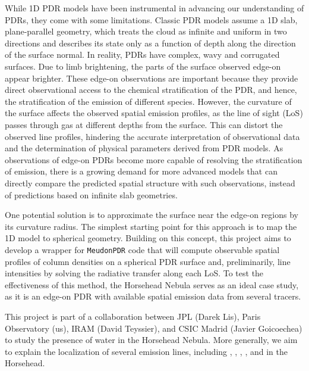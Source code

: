 \documentclass[12pt,a4paper]{article}
\newcommand{\mdpdr}{\texttt{MeudonPDR} code}
\begin{document}
While 1D PDR models have been instrumental in advancing our understanding of PDRs, they come with some limitations. Classic PDR models assume a 1D slab, plane-parallel geometry, which treats the cloud as infinite and uniform in two directions and describes its state only as a function of depth along the direction of the surface normal. In reality, PDRs have complex, wavy and corrugated surfaces. Due to limb brightening, the parts of the surface observed edge-on appear brighter. These edge-on observations are important because they provide direct observational access to the chemical stratification of the PDR, and hence, the stratification of the emission of different species. However, the curvature of the surface affects the observed spatial emission profiles, as the line of sight (LoS) passes through gas at different depths from the surface. This can distort the observed line profiles, hindering the accurate interpretation of observational data and the determination of physical parameters derived from PDR models. As observations of edge-on PDRs become more capable of resolving the stratification of emission, there is a growing demand for more advanced models that can directly compare the predicted spatial structure with such observations, instead of predictions based on infinite slab geometries.

One potential solution is to approximate the surface near the edge-on regions by its curvature radius. The simplest starting point for this approach is to map the 1D model to spherical geometry. Building on this concept, this project aims to develop a wrapper for \mdpdr{} that will compute observable spatial profiles of column densities on a spherical PDR surface and, preliminarily, line intensities by solving the radiative transfer along each LoS. To test the effectiveness of this method, the Horsehead Nebula serves as an ideal case study, as it is an edge-on PDR with available spatial emission data from several tracers.

This project is part of a collaboration between JPL (Darek Lis), Paris Observatory (us), IRAM (David Teyssier), and CSIC Madrid (Javier Goicoechea) to study the presence of water in the Horsehead Nebula. More generally, we aim to explain the localization of several emission lines, including , , , , and  in the Horsehead.
\end{document}
